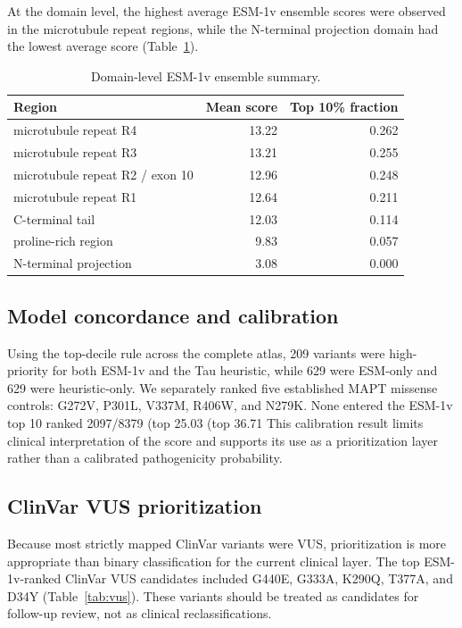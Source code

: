 \documentclass[11pt]{article}
\begin{document}
At the domain level, the highest average ESM-1v ensemble scores were observed in
the microtubule repeat regions, while the N-terminal projection domain had the
lowest average score (Table~\ref{tab:domain}).

\begin{table}[H]
\centering
\caption{Domain-level ESM-1v ensemble summary.}
\label{tab:domain}
\begin{tabular}{lrr}
\toprule
Region & Mean score & Top 10\% fraction \\
\midrule
microtubule repeat R4 & 13.22 & 0.262 \\
microtubule repeat R3 & 13.21 & 0.255 \\
microtubule repeat R2 / exon 10 & 12.96 & 0.248 \\
microtubule repeat R1 & 12.64 & 0.211 \\
C-terminal tail & 12.03 & 0.114 \\
proline-rich region & 9.83 & 0.057 \\
N-terminal projection & 3.08 & 0.000 \\
\bottomrule
\end{tabular}
\end{table}

\subsection{Model concordance and calibration}

Using the top-decile rule across the complete atlas, 209 variants were high-priority
for both ESM-1v and the Tau heuristic, while 629 were ESM-only and 629 were
heuristic-only. We separately ranked five established MAPT missense controls:
G272V, P301L, V337M, R406W, and N279K. None entered the ESM-1v top 10%
ranked 2097/8379 (top 25.03%
(top 36.71%
This calibration result limits clinical interpretation of the score and supports its
use as a prioritization layer rather than a calibrated pathogenicity probability.
\subsection{ClinVar VUS prioritization}

Because most strictly mapped ClinVar variants were VUS, prioritization is more
appropriate than binary classification for the current clinical layer. The top
ESM-1v-ranked ClinVar VUS candidates included G440E, G333A, K290Q, T377A, and
D34Y (Table~\ref{tab:vus}). These variants should be treated as candidates for
follow-up review, not as clinical reclassifications.
\end{document}
